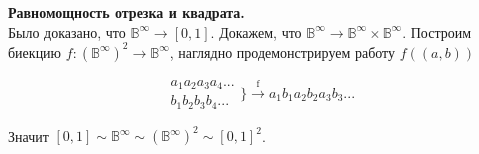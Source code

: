 \textbf{Равномощность отрезка и квадрата.}\\

Было доказано, что $\mathbb{B}^{\infty} \to [0, 1]$. Докажем, что $\mathbb{B}^{\infty} \to \mathbb{B}^{\infty} \times \mathbb{B}^{\infty}$.
Построим биекцию $f : (\mathbb{B}^{\infty})^2 \to \mathbb{B}^{\infty}$, наглядно продемонстрируем работу $f((a, b))$

\begin{equation*}
\begin{matrix}
    a_1 a_2 a_3 a_4 ...\\
    b_1 b_2 b_3 b_4 ...
\end{matrix} \Bigg\}
\xrightarrow{\mbox{f}} a_1 b_1 a_2 b_2 a_3 b_3 ...
\end{equation*}

Значит $[0, 1] \sim \mathbb{B}^{\infty} \sim (\mathbb{B}^{\infty} )^2 \sim [0, 1]^2$.
